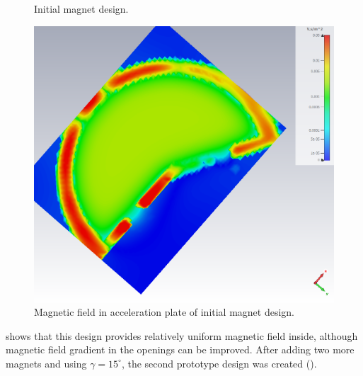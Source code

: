 \documentclass{article}
\begin{document}
\begin{figure}[H]
    \centering
    \qquad{}%
    \vspace{20pt}
    \caption{\centering Initial magnet design.} 
    \label{fig:initial_magnet_design}
\end{figure}
\vspace{20pt}
\begin{figure}[H]
    \centering
    \includegraphics[width=.8\linewidth]{../../../figures/cst/cst_first_magnet_design3.png}
    \vspace{20pt}
    \caption{Magnetic field in acceleration plate of initial magnet design.}
    \label{fig:initial_magnet_design_B}
\end{figure}
\clearpage
{} shows that this design provides relatively uniform magnetic field inside, although magnetic field gradient in the openings can be improved.
After adding two more magnets and using $\gamma=15^\circ$, the second prototype design was created ().
\end{document}
